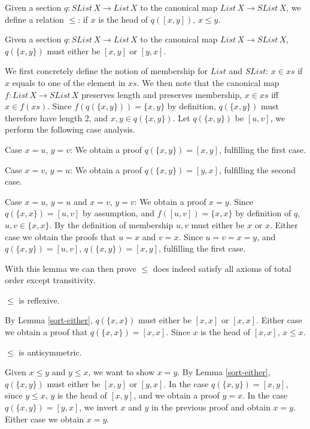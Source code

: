 \documentclass{article}
\begin{document}
\begin{mydef}
    Given a section $q : SList \, X \rightarrow List \, X$ to the canonical map $List \, X \rightarrow SList \, X$,
    we define a relation $\leq$: if $x$ is the head of $q([x, y])$, $x \leq y$.
\end{mydef}

\begin{mylemma}
    \label{sort-either}
    Given a section $q : SList \, X \rightarrow List \, X$ to the canonical map $List \, X \rightarrow SList \, X$,
    $q(\{x, y\})$ must either be $[x, y]$ or $[y, x]$.
\end{mylemma}

We first concretely define the notion of membership for $List$ and $SList$: $x \in xs$ if $x$ equals to one of the element in $xs$.
We then note that the canonical map $f : List \, X \rightarrow SList \, X$ preserves length and preserves membership, $x \in xs$ iff $x \in f(xs)$.
Since $f(q(\{x, y\})) = \{x, y\}$ by definition, $q(\{x,y\})$ must therefore have length 2, and $x, y \in q(\{x, y\})$.
Let $q(\{x, y\})$ be $[u, v]$, we perform the following case analysis.

Case $x = u$, $y = v$: We obtain a proof $q(\{x, y\}) = [x, y]$, fulfilling the first case.

Case $x = v$, $y = u$: We obtain a proof $q(\{x, y\}) = [y, x]$, fulfilling the second case.

Case $x = u$, $y = u$ and $x = v$, $y = v$: We obtain a proof $x = y$. Since $q(\{x, x\}) = [u , v]$ by assumption,
and $f([u, v]) = \{x, x\}$ by definition of $q$, $u, v \in \{x, x\}$. By the definition of membership $u, v$ must either be $x$ or $x$.
Either case we obtain the proofs that $u = x$ and $v = x$. Since $u = v = x = y$, and $q(\{x, y\}) = [u, v]$, $q(\{x, y\}) = [x, y]$, fulfilling the first case.

With this lemma we can then prove $\leq$ does indeed satisfy all axioms of total order except transitivity.

\begin{mythm}
    $\leq$ is reflexive.
\end{mythm}
    By Lemma \ref{sort-either}, $q(\{x, x\})$ must either be $[x, x]$ or $[x ,x]$. Either case we obtain a proof that
    $q(\{x, x\}) = [x, x]$. Since $x$ is the head of $[x, x]$, $x \leq x$.

\begin{mythm}
    $\leq$ is antisymmetric.
\end{mythm}
    Given $x \leq y$ and $y \leq x$, we want to show $x = y$.
    By Lemma \ref{sort-either}, $q(\{x, y\})$ must either be $[x, y]$ or $[y, x]$. In the case $q(\{x, y\}) = [x, y]$,
    since $y \leq x$, $y$ is the head of $[x, y]$, and we obtain a proof $y = x$. In the case $q(\{x, y\}) = [y, x]$,
    we invert $x$ and $y$ in the previous proof and obtain $x = y$. Either case we obtain $x = y$.
\end{document}
